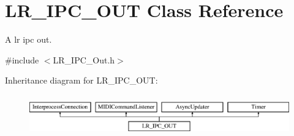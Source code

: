 \hypertarget{class_l_r___i_p_c___o_u_t}{}\section{L\+R\+\_\+\+I\+P\+C\+\_\+\+O\+UT Class Reference}
\label{class_l_r___i_p_c___o_u_t}


A lr ipc out.  




{\ttfamily \#include $<$L\+R\+\_\+\+I\+P\+C\+\_\+\+Out.\+h$>$}

Inheritance diagram for L\+R\+\_\+\+I\+P\+C\+\_\+\+O\+UT\+:\begin{figure}[H]
\begin{center}
\leavevmode
\includegraphics[height=1.818182cm]{class_l_r___i_p_c___o_u_t}
\end{center}
\end{figure}
